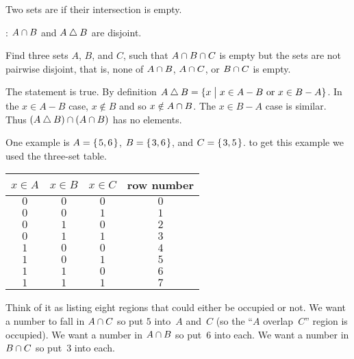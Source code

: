 \documentclass{test}  %
\begin{document}
\begin{df}
Two sets are  if their intersection is empty.  
\end{df}

\begin{ex}
\begin{exes}
\item \pord: $A\cap B$ and $A\mathbin{\triangle} B$ are disjoint.  
\item Find three sets $A$, $B$, and $C$, such that 
$A\cap B\cap C$ is empty but the sets are
not pairwise disjoint, that is, none of $A\cap B$, 
$A\cap C$, or $B\cap C$ is empty. 
\end{exes}
\begin{ans}
\begin{exes}
\item The statement is true.
  By definition $A\mathbin{\triangle} B=\{x \bigm| \text{$x\in A-B$ or $x\in B-A$}\}$.
  In the $x\in A-B$ case, $x\notin B$ and so $x\notin A\cap B$.
  The $x\in B-A$ case is similar.
  Thus $(A\mathbin{\triangle} B)\cap (A\cap B)$ has no elements.
\item One example is $A=\mbox{$\{\hspace{0.1em}5,6\hspace{0.1em}\}$}$, $B=\mbox{$\{\hspace{0.1em}3,6\hspace{0.1em}\}$}$, and 
  $C=\mbox{$\{\hspace{0.1em}3,5\hspace{0.1em}\}$}$.
  \remark
  to get this example we used the three-set table.
  \begin{center} \small
    \begin{tabular}{ccc|c}
      $x\in A$  &$x\in B$  &$x\in C$  &row number \\ \hline
         $0$    &$0$       &$0$       &$0$    \\
         $0$    &$0$       &$1$       &$1$    \\
         $0$    &$1$       &$0$       &$2$    \\
         $0$    &$1$       &$1$       &$3$    \\[.5ex]
         $1$    &$0$       &$0$       &$4$    \\
         $1$    &$0$       &$1$       &$5$    \\
         $1$    &$1$       &$0$       &$6$    \\
         $1$    &$1$       &$1$       &$7$    
    \end{tabular}
  \end{center}
  Think of it as listing eight regions that could either be occupied or not.
  We want a number to fall in $A\cap C$ so put
  $5$ into~$A$ and~$C$ (so the ``$A$ overlap~$C$'' region is occupied).
  We want a number in $A\cap B$ so put~$6$ into each.
  We want a number in $B\cap C$ so put~$3$ into each.
\end{exes}
\end{ans}
\end{ex}
\end{document}
